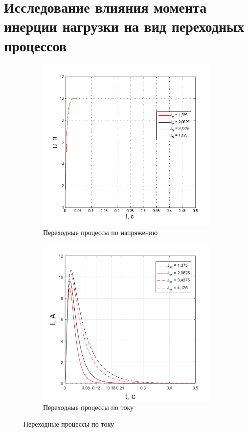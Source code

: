 \documentclass[fleqn, a4paper, 11pt, russian]{article}
\begin{document}
	\section{Исследование влияния момента инерции нагрузки на вид переходных процессов}
	\begin{figure}[ht!]
		\centering
		\begin{subfigure}[b]{0.48\textwidth}
			\includegraphics[width = \textwidth]{Jvar/JvarU}
			\caption{Переходные процессы по напряжению}
		\end{subfigure}
		\hfill
		\begin{subfigure}[b]{0.48\textwidth}
			\includegraphics[width = \textwidth]{Jvar/JvarI}
			\caption{Переходные процессы по току}
		\end{subfigure}
	\end{figure}
	
\end{document}
